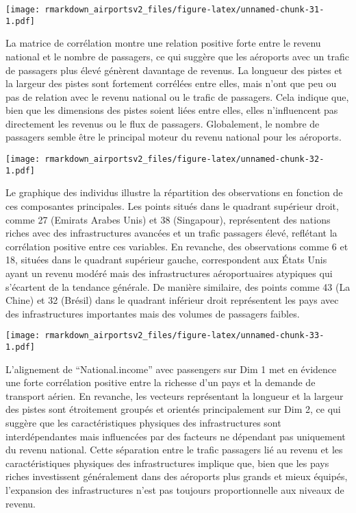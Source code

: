 \documentclass[
]{compterendu}
\begin{document}
\texttt{[image: rmarkdown\_airportsv2\_files/figure-latex/unnamed-chunk-31-1.pdf]}

La matrice de corrélation montre une relation positive forte entre le
revenu national et le nombre de passagers, ce qui suggère que les
aéroports avec un trafic de passagers plus élevé génèrent davantage de
revenus. La longueur des pistes et la largeur des pistes sont fortement
corrélées entre elles, mais n'ont que peu ou pas de relation avec le
revenu national ou le trafic de passagers. Cela indique que, bien que
les dimensions des pistes soient liées entre elles, elles n'influencent
pas directement les revenus ou le flux de passagers. Globalement, le
nombre de passagers semble être le principal moteur du revenu national
pour les aéroports.

\texttt{[image: rmarkdown\_airportsv2\_files/figure-latex/unnamed-chunk-32-1.pdf]}

Le graphique des individus illustre la répartition des observations en
fonction de ces composantes principales. Les points situés dans le
quadrant supérieur droit, comme 27 (Emirats Arabes Unis) et 38
(Singapour), représentent des nations riches avec des infrastructures
avancées et un trafic passagers élevé, reflétant la corrélation positive
entre ces variables. En revanche, des observations comme 6 et 18,
situées dans le quadrant supérieur gauche, correspondent aux États Unis
ayant un revenu modéré mais des infrastructures aéroportuaires atypiques
qui s'écartent de la tendance générale. De manière similaire, des points
comme 43 (La Chine) et 32 (Brésil) dans le quadrant inférieur droit
représentent les pays avec des infrastructures importantes mais des
volumes de passagers faibles.

\texttt{[image: rmarkdown\_airportsv2\_files/figure-latex/unnamed-chunk-33-1.pdf]}

L'alignement de ``National.income'' avec passengers sur Dim 1 met en
évidence une forte corrélation positive entre la richesse d'un pays et
la demande de transport aérien. En revanche, les vecteurs représentant
la longueur et la largeur des pistes sont étroitement groupés et
orientés principalement sur Dim 2, ce qui suggère que les
caractéristiques physiques des infrastructures sont interdépendantes
mais influencées par des facteurs ne dépendant pas uniquement du revenu
national. Cette séparation entre le trafic passagers lié au revenu et
les caractéristiques physiques des infrastructures implique que, bien
que les pays riches investissent généralement dans des aéroports plus
grands et mieux équipés, l'expansion des infrastructures n'est pas
toujours proportionnelle aux niveaux de revenu.
\end{document}
